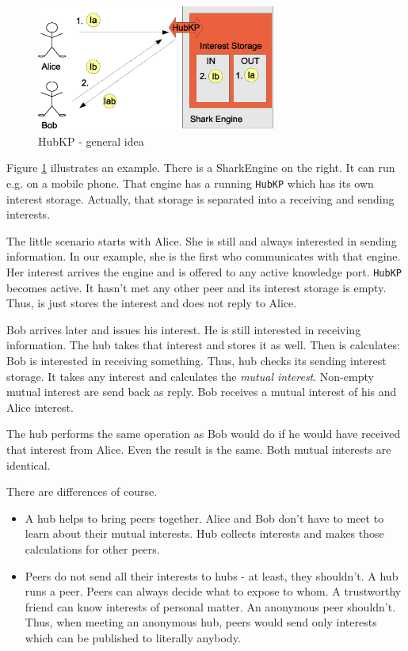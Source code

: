 {\begin{figure}[t]
\centering
\includegraphics[width=0.70\textwidth]{hubKP.eps}
\caption{HubKP - general idea}
\label{fig:hubKP}
\end{figure}

Figure \ref{fig:hubKP} illustrates an example. There is a SharkEngine on the right. It can run e.g. on a mobile phone. That engine has a running {\tt HubKP} which has its own interest storage. Actually, that storage is separated into a receiving and sending interests. 

The little scenario starts with Alice. She is still and always interested in sending information. In our example, she is the first who communicates with that engine. Her interest arrives the engine and is offered to any active knowledge port. {\tt HubKP} becomes active. It hasn't met any other peer and its interest storage is empty. Thus, is just stores the interest and does not reply to Alice.

Bob arrives later and issues his interest. He is still interested in receiving information. The hub takes that interest and stores it as well. Then is calculates: Bob is interested in receiving something. Thus, hub checks its sending interest storage. It takes any interest and calculates the {\it mutual interest}. Non-empty mutual interest are send back as reply. Bob receives a mutual interest of his and Alice interest. 

The hub performs the same operation as Bob would do if he would have received that interest from Alice. Even the result is the same. Both mutual interests are identical. 

There are differences of course.

\begin{itemize}
\item 
A hub helps to bring peers together. Alice and Bob don't have to meet to learn about their mutual interests. Hub collects interests and makes those calculations for other peers.
\item 
Peers do not send all their interests to hubs - at least, they shouldn't. A hub runs a peer. Peers can always decide what to expose to whom. A trustworthy friend can know interests of personal matter. An anonymous peer shouldn't. 
Thus, when meeting an anonymous hub, peers would send only interests which can be published to literally anybody. 
\end{itemize}

}
